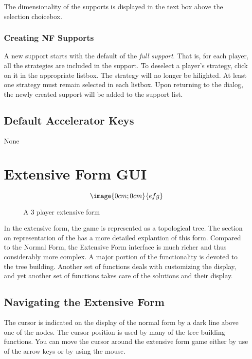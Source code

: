 The dimensionality of the supports is displayed in the text box above the selection
choicebox.

\subsubsection{Creating NF Supports}\label{NewSupport}
A new support starts with the default of the {\em full support}.  That is, for each player,
all the strategies are included in the support.  To deselect a player's strategy, click on it
in the appropriate listbox.  The strategy will no longer be hilighted.  At least one strategy
must remain selected in each listbox.  Upon returning to the 
 dialog, the newly created support will be added
to the support list.



\subsection{Default Accelerator Keys}\label{NormFormDefAccl}
None


\section{Extensive Form GUI}

\begin{figure}
$$\image{0cm;0cm}{efg}$$
\caption{A 3 player extensive form}\label{fig:efg}
\end{figure}

In the extensive form, the game is represented as a topological tree.  The 
section on representation of the  
has a more detailed explantion of this form.
Compared to the Normal Form, the Extensive Form interface is much richer
and thus considerably more complex.  A major portion of the functionality
is devoted to the tree building.  Another set of functions deals with
customizing the display, and yet another set of functions takes care of
the solutions and their display.  

\subsection{Navigating the Extensive Form}
The cursor is indicated on the display of the normal form by a dark line above 
one of the nodes.  The cursor position is used by many of the tree building functions.  
You can move the cursor around the extensive form game 
either by use of the arrow keys or by using the mouse.  

